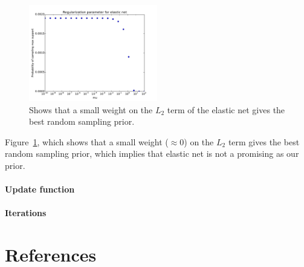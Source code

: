 \documentclass{article} %
\begin{document}
\begin{figure}
  \centering
    \includegraphics[width=0.5\textwidth]{figures/regularization_elastic_net.pdf}
  \caption{Shows that a small weight on the $L_2$ term of the elastic net gives the best random sampling prior.}
  \label{regularization-elastic-net}
\end{figure}
Figure~\ref{regularization-elastic-net}, which shows that a small weight ($\approx 0$) on the $L_2$ term gives the best random sampling prior, which implies that elastic net is not a promising as our prior.

\paragraph{Update function}

\paragraph{Iterations}

\section{References}

\FloatBarrier
\vskip 0.2in
\nocite{*}


\end{document}
